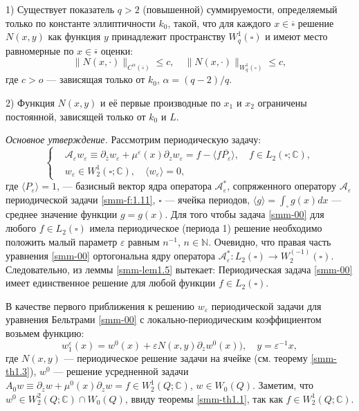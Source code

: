 1) Существует показатель $q>2$ (повышенной) суммируемости, определяемый только по константе эллиптичности $k_0$, такой, что  для каждого $x\in\overline\square$ решение $N(x,y)$ как функция $y$ принадлежит пространству $W_q^1(\square)$ и имеют место равномерные по $x\in\overline\square$ оценки:
$$
\|N(x,\cdot)\|_{C^\alpha(\overline\square)}\leqslant c,\quad \|N(x,\cdot)\|_{W_q^1(\square)}\leqslant c,
$$
где $c>o$ --- зависящая только от $k_0$, $\alpha=(q-2)/q$.

2) Функция $N(x,y)$ и её первые производные по $x_1$ и $x_2$ ограничены постоянной,
зависящей только от $k_0$ и $L$.

\textit{Основное утверждение.}
Рассмотрим периодическую задачу:
\begin{equation}\label{smm-00}
\left\{\begin{aligned}
&\mathscr{A}_\varepsilon w_\varepsilon\equiv \partial_{\bar{z}}w_\varepsilon +\mu^\varepsilon(x) \partial_{z}w_\varepsilon =f-\langle f\overline{P_\varepsilon}\rangle,\quad f\in L_2(\square;\mathbb{C}),\\
&w_\varepsilon\in W_2^1(\square;\mathbb{C}),	\quad \langle w_\varepsilon\rangle=0,
\end{aligned}\right.	
\end{equation}
		где $\langle P_\varepsilon\rangle=1$, --- базисный вектор ядра оператора $\mathscr{A}_\varepsilon^\ast$, сопряженного оператору $\mathscr{A}_\varepsilon$ периодической задачи \eqref{smm-f:1.11}, $\square$ --- ячейка периодов, $\langle g\rangle=\int_\square g(x)dx$ --- среднее значение функции  $g=g(x)$. Для того чтобы задача \eqref{smm-00} для любого $f\in L_2(\square)$ имела периодическое (периода 1) решение необходимо положить малый параметр $\varepsilon$ равным $n^{-1}$, $n\in \mathbb{N}$.
	Очевидно, что правая часть  уравнения  \eqref{smm-00} ортогональна ядру оператора $\mathscr{A}_\varepsilon^\ast:L_2 (\square)\to W_2^(-1) (\square)$. Следовательно, из леммы \ref{smm-lem1.5} вытекает: Периодическая задача \eqref{smm-00} имеет единственное решение для любой функции $f\in L_2(\square)$.
	

В качестве первого приближения к решению $w_\varepsilon$  периодической задачи
для уравнения Бельтрами \eqref{smm-00} с локально-периодическим коэффициентом возьмем функцию:
$$ w_1^\varepsilon(x)=w^0(x)+\varepsilon N(x,y)\partial_zw^0(x)), \quad y=\varepsilon^{-1}x,$$
где $N(x,y)$  --- периодическое решение задачи на ячейке (см. теорему \ref{smm-th1.3}), $w^0$ --- решение усредненной задачи $A_0w\equiv\partial_{\overline{z}}w+\mu^0(x)\partial_zw=f\in W_2^1(Q;\mathbb{C})$, $w\in W_0(Q)$. Заметим, что $w^0\in W_2^2(Q;\mathbb{C})\cap W_0(Q)$, ввиду 	теоремы \ref{smm-th1.1}, так как $f\in W_2^1(Q;\mathbb{C})$.

